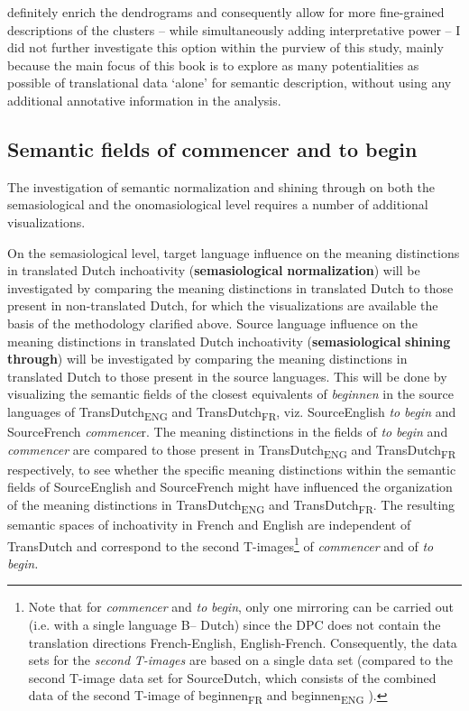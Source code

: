 definitely enrich the dendrograms and consequently allow for more fine-grained descriptions of the clusters – while simultaneously adding interpretative power – I did not further investigate this option within the purview of this study, mainly because the main focus of this book is to explore as many potentialities as possible of translational data ‘alone’ for semantic description, without using any additional annotative information in the analysis.


\subsection{\label{sec:3.8.2}  Semantic fields of commencer and to begin}

The investigation of semantic normalization and shining through on both the semasiological and the onomasiological level requires a number of additional visualizations.



On the semasiological level, target language influence on the meaning distinctions in translated Dutch inchoativity (\textbf{semasiological} \textbf{normalization}) will be investigated by comparing the meaning distinctions in translated Dutch to those present in non-translated Dutch, for which the visualizations are available the basis of the methodology clarified above. Source language influence on the meaning distinctions in translated Dutch inchoativity (\textbf{semasiological} \textbf{shining} \textbf{through}) will be investigated by comparing the meaning distinctions in translated Dutch to those present in the source languages. This will be done by visualizing the semantic fields of the closest equivalents of \textit{beginnen} in the source languages of TransDutch\textsubscript{ENG} and TransDutch\textsubscript{FR}, viz. SourceEnglish \textit{to} \textit{begin} and SourceFrench \textit{commence}r. The meaning distinctions in the fields of \textit{to} \textit{begin} and \textit{commencer} are compared to those present in TransDutch\textsubscript{ENG} and TransDutch\textsubscript{FR} respectively, to see whether the specific meaning distinctions within the semantic fields of SourceEnglish and SourceFrench might have influenced the organization of the meaning distinctions in TransDutch\textsubscript{ENG} and TransDutch\textsubscript{FR}. The resulting semantic spaces of inchoativity in French and English are independent of TransDutch and correspond to the second T-images\footnote{Note that for \textit{commencer} and \textit{to} \textit{begin}, only one mirroring can be carried out (i.e. with a single language B– Dutch) since the DPC does not contain the translation directions French-English, English-French. Consequently, the data sets for the \textit{second} \textit{T-images} are based on a single data set (compared to the second T-image data set for SourceDutch, which consists of the combined data of the second T-image of beginnen\textsubscript{FR} and beginnen\textsubscript{ENG} ).} of \textit{commencer} and of \textit{to} \textit{begin.}



